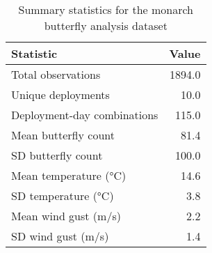 \begin{table}

\caption{Summary statistics for the monarch butterfly analysis dataset}
\centering
\begin{tabular}[t]{lr}
\toprule
Statistic & Value\\
\midrule
Total observations & 1894.0\\
Unique deployments & 10.0\\
Deployment-day combinations & 115.0\\
Mean butterfly count & 81.4\\
SD butterfly count & 100.0\\
\addlinespace
Mean temperature (°C) & 14.6\\
SD temperature (°C) & 3.8\\
Mean wind gust (m/s) & 2.2\\
SD wind gust (m/s) & 1.4\\
\bottomrule
\end{tabular}
\end{table}
